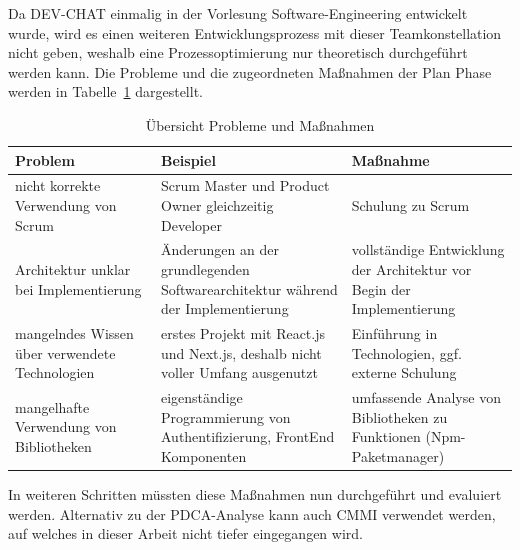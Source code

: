 Da DEV-CHAT einmalig in der Vorlesung Software-Engineering entwickelt wurde, wird es einen weiteren Entwicklungsprozess mit dieser Teamkonstellation nicht geben, weshalb eine Prozessoptimierung nur theoretisch durchgeführt werden kann.
Die Probleme und die zugeordneten Maßnahmen der Plan Phase werden in Tabelle~\ref{tab:pdca} dargestellt.
\begin{table}[H]
  \centering
  \begin{tabular}{l|l|l}
    \textbf{Problem} & 
    \textbf{Beispiel} & 
    \textbf{Maßnahme} 
    \\\hline
    \multirow{3}{.25\textwidth}{nicht korrekte Verwendung von Scrum} & 
    \multirow{3}{.35\textwidth}{Scrum Master und Product Owner gleichzeitig Developer} & 
    \multirow{3}{.3\textwidth}{Schulung zu Scrum} 
    \\
    &&\\
    &&\\\hline
    \multirow{4}{.25\textwidth}{Architektur unklar bei Implementierung} &
    \multirow{4}{.35\textwidth}{Änderungen an der grund\-le\-gen\-den Softwarearchitektur während der Implementierung} & 
    \multirow{4}{.3\textwidth}{vollständige Entwicklung der Architektur vor Begin der Implementierung} 
    \\
    &&\\
    &&\\
    &&\\\hline
    \multirow{3}{.25\textwidth}{mangelndes Wissen über verwendete Technologien} & 
    \multirow{3}{.35\textwidth}{erstes Projekt mit React.js und Next.js, deshalb nicht voller Umfang ausgenutzt} & 
    \multirow{3}{.3\textwidth}{Einführung in Technologien, ggf. externe Schulung}
    \\
    &&\\
    &&\\\hline
    \multirow{3}{.25\textwidth}{mangelhafte Verwendung von Bibliotheken} &
    \multirow{3}{.35\textwidth}{eigenständige Programmierung von Authentifizierung, FrontEnd Komponenten} & 
    \multirow{3}{.3\textwidth}{umfassende Analyse von Bibliotheken zu Funktionen (Npm-Paketmanager)}
    \\
    &&\\
    &&\\ 
  \end{tabular}
  \caption{Übersicht Probleme und Maßnahmen}
  \label{tab:pdca}
\end{table}\noindent
In weiteren Schritten müssten diese Maßnahmen nun durchgeführt und evaluiert werden.
Alternativ zu der PDCA-Analyse kann auch \ac{CMMI} verwendet werden, auf welches in dieser Arbeit nicht tiefer eingegangen wird.
